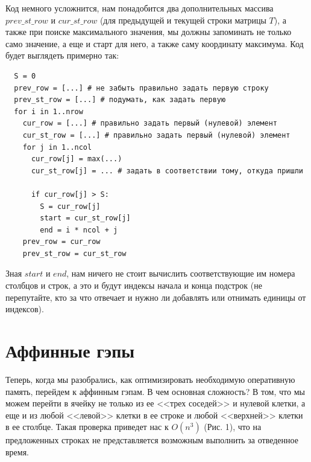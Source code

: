 \documentclass[letterpaper, 11pt]{article}
\begin{document}
Код немного усложнится, нам понадобится два дополнительных массива $prev\_st\_row$ и $cur\_st\_row$ (для предыдущей и текущей строки матрицы $T$), а также при поиске максимального значения, мы должны запоминать не только само значение, а еще и старт для него, а также саму координату максимума. Код будет выглядеть примерно так:

\begin{verbatim}
  S = 0
  prev_row = [...] # не забыть правильно задать первую строку
  prev_st_row = [...] # подумать, как задать первую
  for i in 1..nrow
    cur_row = [...] # правильно задать первый (нулевой) элемент
    cur_st_row = [...] # правильно задать первый (нулевой) элемент
    for j in 1..ncol
      cur_row[j] = max(...)
      cur_st_row[j] = ... # задать в соответствии тому, откуда пришли
      
      if cur_row[j] > S:
        S = cur_row[j]
        start = cur_st_row[j]
        end = i * ncol + j
    prev_row = cur_row
    prev_st_row = cur_st_row
\end{verbatim}

Зная $start$ и $end$, нам ничего не стоит вычислить соответствующие им номера столбцов и строк, а это и будут индексы начала и конца подстрок (не перепутайте, кто за что отвечает и нужно ли добавлять или отнимать единицы от индексов).

\section{Аффинные гэпы}

Теперь, когда мы разобрались, как оптимизировать необходимую оперативную память, перейдем к аффинным гэпам. В чем основная сложность? В том, что мы можем перейти в ячейку не только из ее <<трех соседей>> и нулевой клетки, а еще и из любой <<левой>> клетки в ее строке и любой <<верхней>> клетки в ее столбце. Такая проверка приведет нас к $O(n^3)$ (Рис. 1), что на предложенных строках не представляется возможным выполнить за отведенное время.
\end{document}
